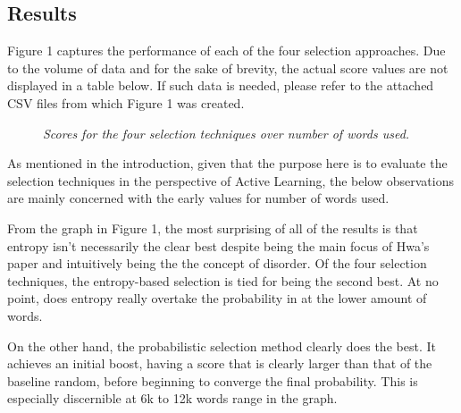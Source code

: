 \documentclass{article} %
\begin{document}
\subsection{Results}

Figure 1 captures the performance of each of the four selection approaches. Due to the volume of data and for the sake of brevity, the actual score values are not displayed in a table below. If such data is needed, please refer to the attached CSV files from which Figure 1 was created.

\begin{figure}%
	\centering
    \caption{\textit{Scores for the four selection techniques over number of words used.}}
    \label{fig:default}
\end{figure}

As mentioned in the introduction, given that the purpose here is to evaluate the selection techniques in the perspective of Active Learning, the below observations are mainly concerned with the early values for number of words used.

From the graph in Figure 1, the most surprising of all of the results is that entropy isn't necessarily the clear best despite being the main focus of Hwa's paper and intuitively being the the concept of disorder. Of the four selection techniques, the entropy-based selection is tied for being the second best. At no point, does entropy really overtake the probability in at the lower amount of words. 

On the other hand, the probabilistic selection method clearly does the best. It achieves an initial boost, having a score that is clearly larger than that of the baseline random, before beginning to converge the final probability. This is especially discernible at 6k to 12k words range in the graph.
\end{document}
